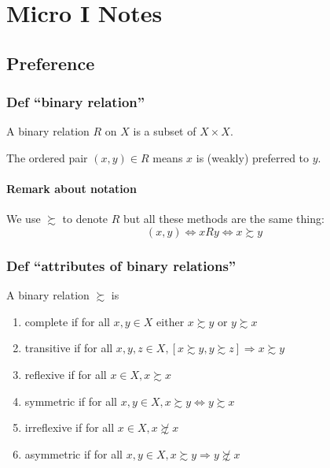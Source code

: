 \documentclass[
]{article}
\author{Parker Howell}
\date{Last Updated: 2023-09-25}
\providecommand{\tightlist}{%
  \setlength{\itemsep}{0pt}\setlength{\parskip}{0pt}}
\begin{document}
\hypertarget{micro-i-notes}{%
\section{Micro I Notes}\label{micro-i-notes}}

\hypertarget{preference}{%
\subsection{Preference}\label{preference}}

\hypertarget{def-binary-relation}{%
\subsubsection{Def ``binary relation''}\label{def-binary-relation}}

A binary relation \(R\) on \(X\) is a subset of \(X \times X\).

The ordered pair \((x,y) \in R\) means \(x\) is (weakly) preferred to
\(y\).

\hypertarget{remark-about-notation}{%
\paragraph{Remark about notation}\label{remark-about-notation}}

We use \(\succsim\) to denote \(R\) but all these methods are the same
thing: \[(x,y)  \iff xRy \iff x \succsim y\]

\hypertarget{def-attributes-of-binary-relations}{%
\subsubsection{Def ``attributes of binary
relations''}\label{def-attributes-of-binary-relations}}

A binary relation \(\succsim\) is

\begin{enumerate}
\def\labelenumi{\arabic{enumi}.}
\tightlist
\item
  complete if for all \(x,y\in X\) either \(x \succsim y\) or
  \(y \succsim x\)
\item
  transitive if for all
  \(x,y,z\in X, [x \succsim y, y \succsim z] \Rightarrow x \succsim y\)
\item
  reflexive if for all \(x \in X, x \succsim x\)
\item
  symmetric if for all \(x,y\in X, x \succsim y \iff y \succsim x\)
\item
  irreflexive if for all \(x \in X, x \not\succsim x\)
\item
  asymmetric if for all
  \(x,y\in X, x \succsim y \Rightarrow y \not\succsim x\)
\end{enumerate}
\end{document}
